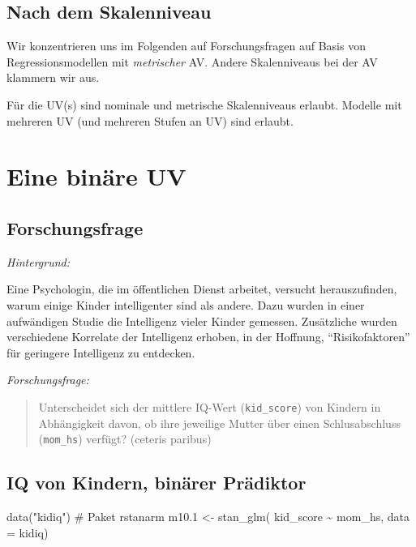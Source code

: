 \documentclass[
  a4paper,
  DIV=11]{scrreprt}
\newenvironment{Shaded}{\begin{snugshade}}{\end{snugshade}}
\newcommand{\AttributeTok}[1]{\textcolor[rgb]{0.40,0.45,0.13}{#1}}
\newcommand{\CommentTok}[1]{\textcolor[rgb]{0.37,0.37,0.37}{#1}}
\newcommand{\FloatTok}[1]{\textcolor[rgb]{0.68,0.00,0.00}{#1}}
\newcommand{\FunctionTok}[1]{\textcolor[rgb]{0.28,0.35,0.67}{#1}}
\newcommand{\NormalTok}[1]{\textcolor[rgb]{0.00,0.23,0.31}{#1}}
\newcommand{\OtherTok}[1]{\textcolor[rgb]{0.00,0.23,0.31}{#1}}
\newcommand{\SpecialCharTok}[1]{\textcolor[rgb]{0.37,0.37,0.37}{#1}}
\newcommand{\StringTok}[1]{\textcolor[rgb]{0.13,0.47,0.30}{#1}}
\theoremstyle{definition}
\theoremstyle{remark}
\begin{document}
\hypertarget{nach-dem-skalenniveau}{%
\subsection{Nach dem Skalenniveau}\label{nach-dem-skalenniveau}}

Wir konzentrieren uns im Folgenden auf Forschungsfragen auf Basis von
Regressionsmodellen mit \emph{metrischer} AV. Andere Skalenniveaus bei
der AV klammern wir aus.

Für die UV(s) sind nominale und metrische Skalenniveaus erlaubt. Modelle
mit mehreren UV (und mehreren Stufen an UV) sind erlaubt.

\hypertarget{eine-binuxe4re-uv}{%
\section{Eine binäre UV}\label{eine-binuxe4re-uv}}

\hypertarget{forschungsfrage}{%
\subsection{Forschungsfrage}\label{forschungsfrage}}

\emph{Hintergrund:}

Eine Psychologin, die im öffentlichen Dienst arbeitet, versucht
herauszufinden, warum einige Kinder intelligenter sind als andere. Dazu
wurden in einer aufwändigen Studie die Intelligenz vieler Kinder
gemessen. Zusätzliche wurden verschiedene Korrelate der Intelligenz
erhoben, in der Hoffnung, ``Risikofaktoren'' für geringere Intelligenz
zu entdecken.

\emph{Forschungsfrage:}

\begin{quote}
Unterscheidet sich der mittlere IQ-Wert (\texttt{kid\_score}) von
Kindern in Abhängigkeit davon, ob ihre jeweilige Mutter über einen
Schlusabschluss (\texttt{mom\_hs}) verfügt? (ceteris paribus)
\end{quote}

\hypertarget{iq-von-kindern-binuxe4rer-pruxe4diktor}{%
\subsection{IQ von Kindern, binärer
Prädiktor}\label{iq-von-kindern-binuxe4rer-pruxe4diktor}}

\begin{Shaded}
\begin{Highlighting}[]
\FunctionTok{data}\NormalTok{(}\StringTok{"kidiq"}\NormalTok{)  }\CommentTok{\# Paket rstanarm}
\NormalTok{m10}\FloatTok{.1} \OtherTok{\textless{}{-}} \FunctionTok{stan\_glm}\NormalTok{(}
\NormalTok{  kid\_score }\SpecialCharTok{\textasciitilde{}}\NormalTok{ mom\_hs, }
  \AttributeTok{data =}\NormalTok{ kidiq)}
\end{Highlighting}
\end{Shaded}
\end{document}
